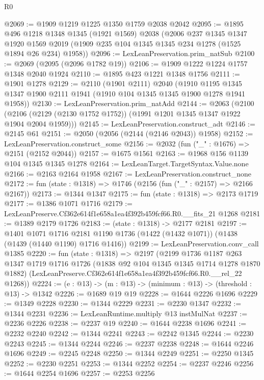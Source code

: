 \begin{lexlean}{R0}
\begin{coremodule}
@2069 := @1909 @1219 @1225 @1350 @1759 @2038 @2042
@2095 := @1895
    @496
    @1218
    @1348
    @1345
    (@1921 @1569)
    @2038
    (@2006
      @237
      @1345
      @1347
      @1920
      @1569
      @2019
      (@1909 @235 @104 @1345 @1345 @234 @1278 (@1525 @1894 @26 @234) @1958))
@2096 := LexLeanPreservation.prim_natSub
@2100 := @2069 (@2095 (@2096 @1782 @19))
@2106 := @1909 @1222 @1224 @1757 @1348 @2040 @1924
@2110 := @1895 @423 @1221 @1348 @1756
@2111 := @1901 @1278
@2129 := @2110
    (@1901 @2111)
    @2040
    (@1910 @1195 @1345 @1347 @1900 @2111 @1941 (@1910 @104 @1345 @1345 @1900 @1278 @1941 @1958))
@2130 := LexLeanPreservation.prim_natAdd
@2144 := @2063
    (@2100 (@2106 (@2129 (@2130 @1752 @1752)) (@1991 @1201 @1345 @1347 @1922 @1904 @2004 @1959)))
@2145 := LexLeanPreservation.construct_adt
@2146 := @2145 @61
@2151 := @2050 (@2056 (@2144 (@2146 @2043)) @1958)
@2152 := LexLeanPreservation.construct_some
@2156 := @2032 (fun ("_" : @1676) => @2151 (@2152 @2044))
@2157 := @1675 @1561
@2163 := @1968 @156 @1139 @104 @1345 @1345 @1278
@2164 := LexLeanTarget.TargetSyntax.Value.none
@2166 := @2163 @2164 @1958
@2167 := LexLeanPreservation.construct_none
@2172 := fun (state : @1318) => @1746 (@2156 (fun ("_" : @2157) => @2166 @2167))
@2173 := @1344 @1347
@2175 := fun (state : @1318) => @2173 @1719
@2177 := @1386 @1071 @1716
@2179 := LexLeanPreserve.Cf362e614f1e658a1ea4f392b459fcf66.R0.__fits_21 @1268
@2181 := @1389 @2179 @1726
@2183 := (state : @1318) -> @2177 @2181
@2197 := @1401
    @1071
    @1716
    @2181
    @1190
    @1736
    (@1422 (@1432 @1071))
    (@1438 (@1439 (@1440 @1190) @1716 @1416))
@2199 := LexLeanPreservation.conv_call @1385
@2220 := fun (state : @1318) =>
  @2197
    (@2199
      @1736
      @1187
      @263
      @1347
      @1719
      @1716
      @1726
      (@1838 @92 @104 @1345 @1345 @1714 @1278 @1870 @1882)
      (LexLeanPreserve.Cf362e614f1e658a1ea4f392b459fcf66.R0.__rel_22 @1268))
@2224 := (e : @13) -> (m : @13) -> (minimum : @13) -> (threshold : @13) -> @1342
@2226 := @1689 @19 @19
@2228 := @1644 @2226 @1696
@2229 := @1349 @2228
@2230 := @1344 @2229
@2231 := @2230 @1347
@2232 := @1344 @2231
@2236 := LexLeanRuntime.multiply @13 instMulNat
@2237 := @2236 @2226
@2238 := @2237 @19
@2240 := @1644 @2238 @1696
@2241 := @2232 @2240
@2242 := @1344 @2241
@2243 := @2242 @1345
@2244 := @2230 @2243
@2245 := @1344 @2244
@2246 := @2237 @2238
@2248 := @1644 @2246 @1696
@2249 := @2245 @2248
@2250 := @1344 @2249
@2251 := @2250 @1345
@2252 := @2230 @2251
@2253 := @1344 @2252
@2254 := @2237 @2246
@2256 := @1644 @2254 @1696
@2257 := @2253 @2256

\end{coremodule}
\end{lexlean}
